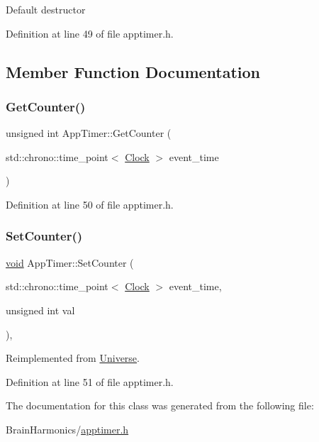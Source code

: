 Default destructor 

Definition at line 49 of file apptimer.\+h.



\subsection{Member Function Documentation}
\mbox{\label{class_app_timer_ab9bb2b5f283b02d6d2292e064ddbd2ab}} 
\subsubsection{\texorpdfstring{Get\+Counter()}{GetCounter()}}
{\footnotesize\ttfamily unsigned int App\+Timer\+::\+Get\+Counter (\begin{DoxyParamCaption}\item[{std\+::chrono\+::time\+\_\+point$<$ \mbox{\hyperlink{universe_8h_a0ef8d951d1ca5ab3cfaf7ab4c7a6fd80}{Clock}} $>$}]{event\+\_\+time }\end{DoxyParamCaption})\hspace{0.3cm}{\ttfamily [inline]}}



Definition at line 50 of file apptimer.\+h.

\mbox{\label{class_app_timer_a77d5d447d6b136a35304b0571a166ddc}} 
\subsubsection{\texorpdfstring{Set\+Counter()}{SetCounter()}}
{\footnotesize\ttfamily \mbox{\hyperlink{glad_8h_a950fc91edb4504f62f1c577bf4727c29}{void}} App\+Timer\+::\+Set\+Counter (\begin{DoxyParamCaption}\item[{std\+::chrono\+::time\+\_\+point$<$ \mbox{\hyperlink{universe_8h_a0ef8d951d1ca5ab3cfaf7ab4c7a6fd80}{Clock}} $>$}]{event\+\_\+time,  }\item[{unsigned int}]{val }\end{DoxyParamCaption})\hspace{0.3cm}{\ttfamily [inline]}, {\ttfamily [virtual]}}



Reimplemented from \mbox{\hyperlink{class_universe_aa22202ae740eb1355529afcb13285e91}{Universe}}.



Definition at line 51 of file apptimer.\+h.



The documentation for this class was generated from the following file\+:\begin{DoxyCompactItemize}
\item 
Brain\+Harmonics/\mbox{\hyperlink{apptimer_8h}{apptimer.\+h}}\end{DoxyCompactItemize}
